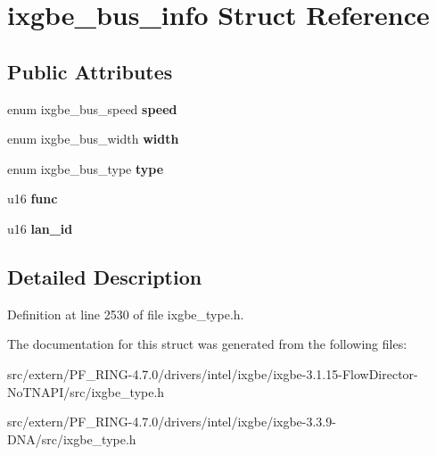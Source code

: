 \hypertarget{structixgbe__bus__info}{
\section{ixgbe\_\-bus\_\-info Struct Reference}
\label{structixgbe__bus__info}
}
\subsection*{Public Attributes}
\begin{DoxyCompactItemize}
\item 
\hypertarget{structixgbe__bus__info_ace149d0eb94bc238aa0976941ab198c4}{
enum ixgbe\_\-bus\_\-speed {\bfseries speed}}
\label{structixgbe__bus__info_ace149d0eb94bc238aa0976941ab198c4}

\item 
\hypertarget{structixgbe__bus__info_a81e77f2103cf0ac326678fef8afac700}{
enum ixgbe\_\-bus\_\-width {\bfseries width}}
\label{structixgbe__bus__info_a81e77f2103cf0ac326678fef8afac700}

\item 
\hypertarget{structixgbe__bus__info_ae82c62dc652f33d1d089d7ac1f26d1d0}{
enum ixgbe\_\-bus\_\-type {\bfseries type}}
\label{structixgbe__bus__info_ae82c62dc652f33d1d089d7ac1f26d1d0}

\item 
\hypertarget{structixgbe__bus__info_a2933a288f617fa8d855dcd0b8d61bf86}{
u16 {\bfseries func}}
\label{structixgbe__bus__info_a2933a288f617fa8d855dcd0b8d61bf86}

\item 
\hypertarget{structixgbe__bus__info_afdddd9361cc3b99166a624f781ce9290}{
u16 {\bfseries lan\_\-id}}
\label{structixgbe__bus__info_afdddd9361cc3b99166a624f781ce9290}

\end{DoxyCompactItemize}


\subsection{Detailed Description}


Definition at line 2530 of file ixgbe\_\-type.h.



The documentation for this struct was generated from the following files:\begin{DoxyCompactItemize}
\item 
src/extern/PF\_\-RING-\/4.7.0/drivers/intel/ixgbe/ixgbe-\/3.1.15-\/FlowDirector-\/NoTNAPI/src/ixgbe\_\-type.h\item 
src/extern/PF\_\-RING-\/4.7.0/drivers/intel/ixgbe/ixgbe-\/3.3.9-\/DNA/src/ixgbe\_\-type.h\end{DoxyCompactItemize}
